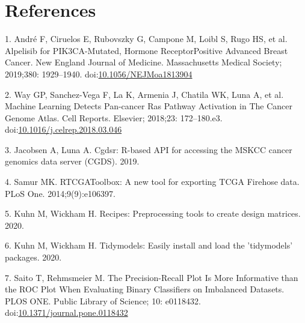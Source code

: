 \documentclass[10pt,letterpaper]{article}
\begin{document}
\hypertarget{references}{%
\section*{References}\label{references}}

\hypertarget{refs}{}
\leavevmode\hypertarget{ref-andre_2019_alpelisib_nengljmeda}{}%
1. André F, Ciruelos E, Rubovszky G, Campone M, Loibl S, Rugo HS, et al.
Alpelisib for PIK3CA-Mutated, Hormone ReceptorPositive Advanced Breast
Cancer. New England Journal of Medicine. Massachusetts Medical Society;
2019;380: 1929--1940.
doi:\href{https://doi.org/10.1056/NEJMoa1813904}{10.1056/NEJMoa1813904}

\leavevmode\hypertarget{ref-way_2018_machine_cellreports}{}%
2. Way GP, Sanchez-Vega F, La K, Armenia J, Chatila WK, Luna A, et al.
Machine Learning Detects Pan-cancer Ras Pathway Activation in The Cancer
Genome Atlas. Cell Reports. Elsevier; 2018;23: 172--180.e3.
doi:\href{https://doi.org/10.1016/j.celrep.2018.03.046}{10.1016/j.celrep.2018.03.046}

\leavevmode\hypertarget{ref-jacobsenCgdsrRbasedAPI2019}{}%
3. Jacobsen A, Luna A. Cgdsr: R-based API for accessing the MSKCC cancer
genomics data server (CGDS). 2019.

\leavevmode\hypertarget{ref-samurRTCGAToolboxNewTool2014}{}%
4. Samur MK. RTCGAToolbox: A new tool for exporting TCGA Firehose data.
PLoS One. 2014;9(9):e106397.

\leavevmode\hypertarget{ref-kuhnRecipesPreprocessingTools2020}{}%
5. Kuhn M, Wickham H. Recipes: Preprocessing tools to create design
matrices. 2020.

\leavevmode\hypertarget{ref-kuhnTidymodelsEasilyInstall2020}{}%
6. Kuhn M, Wickham H. Tidymodels: Easily install and load the
'tidymodels' packages. 2020.

\leavevmode\hypertarget{ref-saitoPrecisionRecallPlotMore2015}{}%
7. Saito T, Rehmsmeier M. The Precision-Recall Plot Is More Informative
than the ROC Plot When Evaluating Binary Classifiers on Imbalanced
Datasets. PLOS ONE. Public Library of Science; 10: e0118432.
doi:\href{https://doi.org/10.1371/journal.pone.0118432}{10.1371/journal.pone.0118432}

\nolinenumbers
\end{document}
